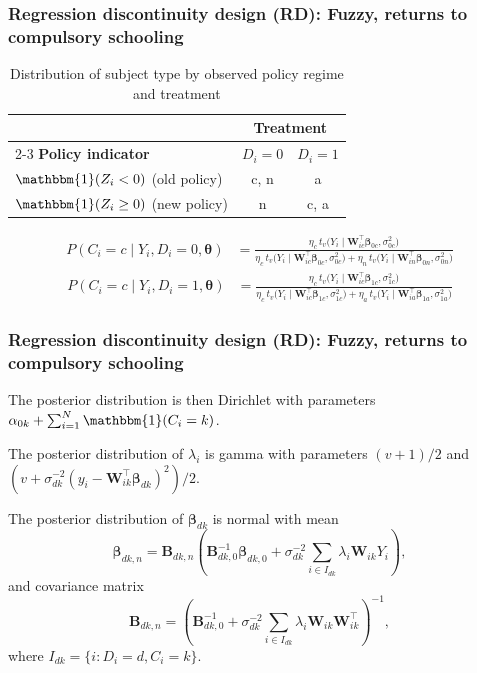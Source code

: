 \documentclass[12pt, compress]{beamer}
\begin{document}
\begin{frame}
	\frametitle{Regression discontinuity design (RD): Fuzzy, returns to compulsory schooling}
\begin{table}[ht]
	\centering
	\caption{Distribution of subject type by observed policy regime and treatment}\label{tab:appCJ}
	\begin{tabular}{lcc}
		\hline
		& \multicolumn{2}{c}{\textbf{Treatment}} \\ 
		\cline{2-3}
		\textbf{Policy indicator} & $D_i = 0$ & $D_i = 1$ \\ 
		\hline
		$\mathbbm{1}(Z_i < 0)$ (old policy) & c, n & a \\
		$\mathbbm{1}(Z_i \geq 0)$ (new policy) & n & c, a \\
		\hline
	\end{tabular}
\end{table}
\footnotesize
\begin{align*}
P(C_i = c \mid Y_i, D_i = 0, \boldsymbol{\theta})
&= \frac{\eta_{c} \, t_v\!\big(Y_i \mid \mathbf{W}_{ic}^{\top} \boldsymbol{\beta}_{0c}, \sigma^2_{0c} \big)}
{\eta_{c} \, t_v\!\big(Y_i \mid \mathbf{W}_{ic}^{\top} \boldsymbol{\beta}_{0c}, \sigma^2_{0c} \big) +
	\eta_{n} \, t_v\!\big(Y_i \mid \mathbf{W}_{in}^{\top} \boldsymbol{\beta}_{0n}, \sigma^2_{0n} \big)}
\end{align*}
\begin{align*}
P(C_i = c \mid Y_i, D_i = 1, \boldsymbol{\theta})
&= \frac{\eta_{c} \, t_v\!\big(Y_i \mid \mathbf{W}_{ic}^{\top} \boldsymbol{\beta}_{1c}, \sigma^2_{1c} \big)}
{\eta_{c} \, t_v\!\big(Y_i \mid \mathbf{W}_{ic}^{\top} \boldsymbol{\beta}_{1c}, \sigma^2_{1c} \big) +
	\eta_{a} \, t_v\!\big(Y_i \mid \mathbf{W}_{ia}^{\top} \boldsymbol{\beta}_{1a}, \sigma^2_{1a} \big)}
\end{align*}
\end{frame}

\begin{frame}
	\frametitle{Regression discontinuity design (RD): Fuzzy, returns to compulsory schooling}
The posterior distribution is then Dirichlet with parameters $\alpha_{0k} + \sum_{i=1}^N \mathbbm{1}(C_i = k)$.

The posterior distribution of $\lambda_i$ is gamma with parameters $(v+1)/2$ and $(v + \sigma_{dk}^{-2}(y_i - \mathbf{W}_{ik}^{\top} \boldsymbol{\beta}_{dk})^2) / 2$.

The posterior distribution of $\boldsymbol{\beta}_{dk}$ is normal with mean
\[
\boldsymbol{\beta}_{dk,n} = \mathbf{B}_{dk,n} \left( \mathbf{B}_{dk,0}^{-1} \boldsymbol{\beta}_{dk,0} + \sigma_{dk}^{-2} \sum_{i \in I_{dk}} \lambda_i \mathbf{W}_{ik} Y_i \right),
\]
and covariance matrix
\[
\mathbf{B}_{dk,n} = \left( \mathbf{B}_{dk,0}^{-1} + \sigma_{dk}^{-2} \sum_{i \in I_{dk}} \lambda_i \mathbf{W}_{ik} \mathbf{W}_{ik}^{\top} \right)^{-1},
\]
where $I_{dk} = \{i : D_i = d, C_i = k\}$.
\end{frame}
\end{document}
